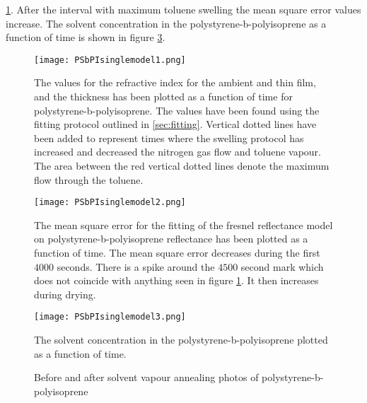 \documentclass[MasterThesisMain.tex]{subfiles}
\begin{document}
\ref{fig:PSbPIsinglemodel1}. After the interval with maximum toluene swelling the mean square error values increase. The solvent concentration in the polystyrene-b-polyisoprene as a function of time is shown in figure \ref{fig:PSbPIsinglemodel3}. 

\begin{figure}[H]
\centering
\texttt{[image: PSbPIsinglemodel1.png]}
\caption{The values for the refractive index for the ambient and thin film, and the thickness has been plotted as a function of time for polystyrene-b-polyisoprene. The values have been found using the fitting protocol outlined in \ref{sec:fitting}. Vertical dotted lines have been added to represent times where the swelling protocol has increased and decreased the nitrogen gas flow and toluene vapour. The area between the red vertical dotted lines denote the maximum flow through the toluene.}
\label{fig:PSbPIsinglemodel1}
\end{figure}

\begin{figure}[H]
\centering
\texttt{[image: PSbPIsinglemodel2.png]}
\caption{The mean square error for the fitting of the fresnel reflectance model on polystyrene-b-polyisoprene reflectance has been plotted as a function of time. The mean square error decreases during the first $4000$ seconds. There is a spike around the $4500$ second mark which does not coincide with anything seen in figure \ref{fig:PSbPIsinglemodel1}. It then increases during drying.}
\label{fig:PSbPIsinglemodel2}
\end{figure}

\begin{figure}[H]
\centering
\texttt{[image: PSbPIsinglemodel3.png]}
\caption{The solvent concentration in the polystyrene-b-polyisoprene plotted as a function of time.}
\label{fig:PSbPIsinglemodel3}
\end{figure}

\begin{figure}
\centering     
{}
\caption{Before and after solvent vapour annealing photos of polystyrene-b-polyisoprene}
\end{figure}
\end{document}
